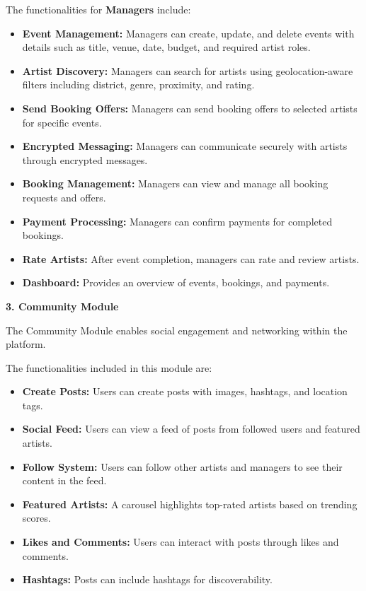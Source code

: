 \documentclass[12pt,a4paper]{report}
\begin{document}
The functionalities for \textbf{Managers} include:

\begin{itemize}
\item \textbf{Event Management:} Managers can create, update, and delete events with details such as title, venue, date, budget, and required artist roles.

\item \textbf{Artist Discovery:} Managers can search for artists using geolocation-aware filters including district, genre, proximity, and rating.

\item \textbf{Send Booking Offers:} Managers can send booking offers to selected artists for specific events.

\item \textbf{Encrypted Messaging:} Managers can communicate securely with artists through encrypted messages.

\item \textbf{Booking Management:} Managers can view and manage all booking requests and offers.

\item \textbf{Payment Processing:} Managers can confirm payments for completed bookings.

\item \textbf{Rate Artists:} After event completion, managers can rate and review artists.

\item \textbf{Dashboard:} Provides an overview of events, bookings, and payments.

\end{itemize}

\textbf{3. Community Module}

The Community Module enables social engagement and networking within the platform.

The functionalities included in this module are:

\begin{itemize}
\item \textbf{Create Posts:} Users can create posts with images, hashtags, and location tags.

\item \textbf{Social Feed:} Users can view a feed of posts from followed users and featured artists.

\item \textbf{Follow System:} Users can follow other artists and managers to see their content in the feed.

\item \textbf{Featured Artists:} A carousel highlights top-rated artists based on trending scores.

\item \textbf{Likes and Comments:} Users can interact with posts through likes and comments.

\item \textbf{Hashtags:} Posts can include hashtags for discoverability.

\end{itemize}
\end{document}
